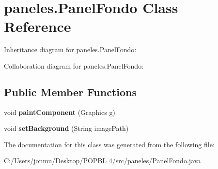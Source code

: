 \hypertarget{classpaneles_1_1_panel_fondo}{}\section{paneles.\+Panel\+Fondo Class Reference}
\label{classpaneles_1_1_panel_fondo}


Inheritance diagram for paneles.\+Panel\+Fondo\+:


Collaboration diagram for paneles.\+Panel\+Fondo\+:
\subsection*{Public Member Functions}
\begin{DoxyCompactItemize}
\item 
\mbox{\label{classpaneles_1_1_panel_fondo_aeaeb3ac61110f0e637b22afc5111e9d7}} 
void {\bfseries paint\+Component} (Graphics g)
\item 
\mbox{\label{classpaneles_1_1_panel_fondo_ae95bde361bef113903c6fa6b1b65acf2}} 
void {\bfseries set\+Background} (String image\+Path)
\end{DoxyCompactItemize}


The documentation for this class was generated from the following file\+:\begin{DoxyCompactItemize}
\item 
C\+:/\+Users/jonmu/\+Desktop/\+P\+O\+P\+B\+L 4/src/paneles/Panel\+Fondo.\+java\end{DoxyCompactItemize}
